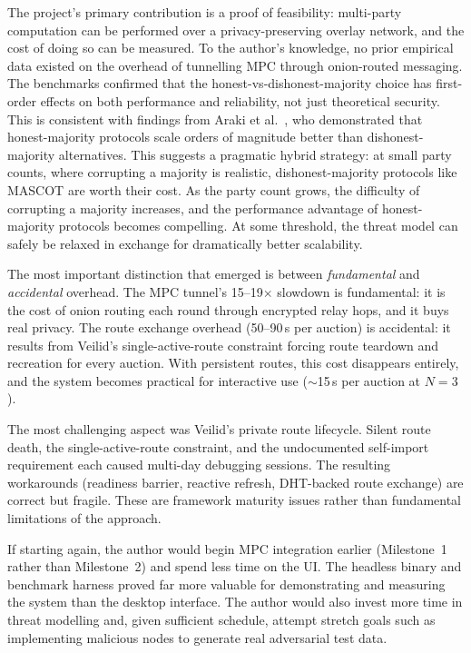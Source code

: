 The project's primary contribution is a proof of feasibility: multi-party
computation can be performed over a privacy-preserving overlay network, and
the cost of doing so can be measured.  To the author's knowledge, no prior empirical data existed on the overhead
of tunnelling MPC through onion-routed messaging.
The benchmarks confirmed that the honest-vs-dishonest-majority choice has
first-order effects on both performance and reliability, not just theoretical
security. This is consistent with findings from Araki et
al.~\cite{araki2017_honest_majority}, who demonstrated that honest-majority
protocols scale orders of magnitude better than dishonest-majority
alternatives.  This suggests a pragmatic hybrid strategy: at small party counts, where
corrupting a majority is realistic, dishonest-majority protocols like MASCOT
are worth their cost.  As the party count grows, the difficulty of
corrupting a majority increases, and the performance advantage of
honest-majority protocols becomes compelling.  At some threshold, the
threat model can safely be relaxed in exchange for dramatically better
scalability.

The most important distinction that emerged is between \emph{fundamental}
and \emph{accidental} overhead.  The MPC tunnel's 15--19$\times$ slowdown
is fundamental: it is the cost of onion routing each round through encrypted
relay hops, and it buys real privacy.  The route exchange overhead (50--90\,s
per auction) is accidental: it results from Veilid's single-active-route
constraint forcing route teardown and recreation for every auction.  With
persistent routes, this cost disappears entirely, and the system becomes
practical for interactive use (${\sim}$15\,s per auction at $N{=}3$).

The most challenging aspect was Veilid's private route lifecycle.  Silent
route death, the single-active-route constraint, and the undocumented
self-import requirement each caused multi-day debugging sessions.  The
resulting workarounds (readiness barrier, reactive refresh, DHT-backed
route exchange) are correct but fragile.  These are framework maturity
issues rather than fundamental limitations of the approach.

If starting again, the author would begin MPC integration earlier (Milestone~1
rather than Milestone~2) and spend less time on the UI.  The headless binary
and benchmark harness proved far more valuable for demonstrating and measuring
the system than the desktop interface.  The author would also invest more time
in threat modelling and, given sufficient schedule, attempt stretch goals such
as implementing malicious nodes to generate real adversarial test data.

